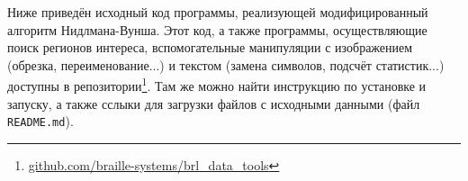 \documentclass{main.tex}[subfiles]
\begin{document}
\newpage
{}
Ниже приведён исходный код программы, реализующей модифицированный алгоритм Нидлмана-Вунша. %
Этот код, а также программы, осуществляющие поиск регионов интереса, вспомогательные манипуляции с изображением (обрезка, переименование...) и текстом (замена символов, подсчёт статистик...) доступны в репозитории\footnote{\href{https://github.com/braille-systems/brl_data_tools}{github.com/braille-systems/brl\_data\_tools}}.
Там же можно найти инструкцию по установке и запуску, а также сслыки для загрузки файлов с исходными данными (файл \texttt{README.md}).


\end{document}
